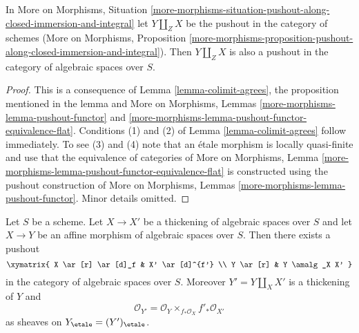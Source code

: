 \begin{lemma}
\label{lemma-pushout-along-closed-immersion-and-integral}
In More on Morphisms, Situation
\ref{more-morphisms-situation-pushout-along-closed-immersion-and-integral}
let $Y \amalg_Z X$ be the pushout in the category of schemes
(More on Morphisms, Proposition
\ref{more-morphisms-proposition-pushout-along-closed-immersion-and-integral}).
Then $Y \amalg_Z X$
is also a pushout in the category of algebraic spaces over $S$.
\end{lemma}

\begin{proof}
This is a consequence of Lemma \ref{lemma-colimit-agrees}, the proposition
mentioned in the lemma and More on Morphisms, Lemmas
\ref{more-morphisms-lemma-pushout-functor} and
\ref{more-morphisms-lemma-pushout-functor-equivalence-flat}.
Conditions (1) and (2) of Lemma \ref{lemma-colimit-agrees}
follow immediately. To see (3) and (4) note that an \'etale morphism
is locally quasi-finite and use that the equivalence of categories of
More on Morphisms, Lemma
\ref{more-morphisms-lemma-pushout-functor-equivalence-flat}
is constructed using the pushout construction of
More on Morphisms, Lemmas \ref{more-morphisms-lemma-pushout-functor}.
Minor details omitted.
\end{proof}

\begin{lemma}
\label{lemma-pushout-along-thickening}
Let $S$ be a scheme. Let $X \to X'$ be a thickening of algebraic spaces
over $S$ and let $X \to Y$ be an affine morphism of algebraic spaces over $S$.
Then there exists a pushout
$$
\xymatrix{
X \ar[r] \ar[d]_f
&
X' \ar[d]^{f'}
\\
Y \ar[r]
&
Y \amalg_X X'
}
$$
in the category of algebraic spaces over $S$. Moreover $Y' = Y \amalg_X X'$
is a thickening of $Y$ and
$$
\mathcal{O}_{Y'} = \mathcal{O}_Y \times_{f_*\mathcal{O}_X} f'_*\mathcal{O}_{X'}
$$
as sheaves on $Y_\etale = (Y')_\etale$.
\end{lemma}

